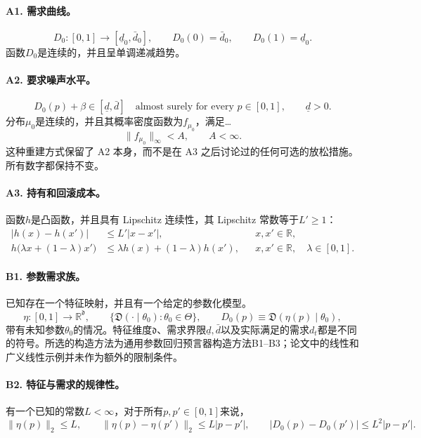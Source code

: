 \documentclass[11pt]{article}
\begin{document}
\paragraph{A1. 需求曲线。}
\[
D_0:[0,1]\longrightarrow[\underline d_0,\bar d_0],
\qquad D_0(0)=\bar d_0,\qquad D_0(1)=\underline d_0.
\]
函数\(D_0\)是连续的，并且呈单调递减趋势。

\paragraph{A2. 要求噪声水平。}
\[
D_0(p)+\beta\in[\underline d,\bar d]
\quad\text{almost surely for every }p\in[0,1],
\qquad \underline d>0.
\]
分布\(\mu_0\)是连续的，并且其概率密度函数为\(f_{\mu_0}\)，满足…
\[
\|f_{\mu_0}\|_{\infty}<A,\qquad A<\infty.
\]
这种重建方式保留了 A2 本身，而不是在 A3 之后讨论过的任何可选的放松措施。所有数字都保持不变。

\paragraph{A3. 持有和回滚成本。}
函数\(h\)是凸函数，并且具有 Lipschitz 连续性，其 Lipschitz 常数等于\(L'\geq1\)：
\[
\begin{aligned}
|h(x)-h(x')|&\leq L'|x-x'|,
&&x,x'\in\mathbb{R},\\
h\bigl(\lambda x+(1-\lambda)x'\bigr)
&\leq\lambda h(x)+(1-\lambda)h(x'),
&&x,x'\in\mathbb{R},\quad\lambda\in[0,1].
\end{aligned}
\]

\paragraph{B1. 参数需求族。}
已知存在一个特征映射，并且有一个给定的参数化模型。
\[
\eta:[0,1]\longrightarrow\mathbb{R}^{\mathfrak d},
\qquad
\{\mathfrak D(\cdot\mid\theta_0):\theta_0\in\Theta\},
\qquad
D_0(p)\equiv\mathfrak D(\eta(p)\mid\theta_0),
\]
带有未知参数\(\theta_0\)的情况。特征维度\(\mathfrak d\)、需求界限\(\underline d,\bar d\)以及实际满足的需求\(d_t\)都是不同的符号。所选的构造方法为通用参数回归预言器构造方法B1–B3；论文中的线性和广义线性示例并未作为额外的限制条件。

\paragraph{B2. 特征与需求的规律性。}
有一个已知的常数\(L<\infty\)，对于所有\(p,p'\in[0,1]\)来说，
\[
\|\eta(p)\|_2\leq L,\qquad
\|\eta(p)-\eta(p')\|_2\leq L|p-p'|,\qquad
|D_0(p)-D_0(p')|\leq L^2|p-p'|.
\]
\end{document}
